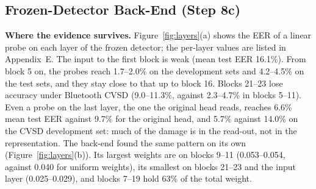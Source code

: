 \documentclass[10pt,a4paper,twocolumn]{article}
\begin{document}
\subsection{Frozen-Detector Back-End (Step 8c)}
\label{sec:backendres}
\textbf{Where the evidence survives.} Figure~\ref{fig:layers}(a) shows the EER of a linear probe on each layer of the frozen detector; the per-layer values are listed in Appendix~E. The input to the first block is weak (mean test EER 16.1\%). From block 5 on, the probes reach 1.7--2.0\% on the development sets and 4.2--4.5\% on the test sets, and they stay close to that up to block 16. Blocks 21--23 lose accuracy under Bluetooth CVSD (9.0--11.3\%, against 2.3--4.7\% in blocks 5--11). Even a probe on the last layer, the one the original head reads, reaches 6.6\% mean test EER against 9.7\% for the original head, and 5.7\% against 14.0\% on the CVSD development set: much of the damage is in the read-out, not in the representation. The back-end found the same pattern on its own (Figure~\ref{fig:layers}(b)). Its largest weights are on blocks 9--11 (0.053--0.054, against 0.040 for uniform weights), its smallest on blocks 21--23 and the input layer (0.025--0.029), and blocks 7--19 hold 63\% of the total weight.
\end{document}
